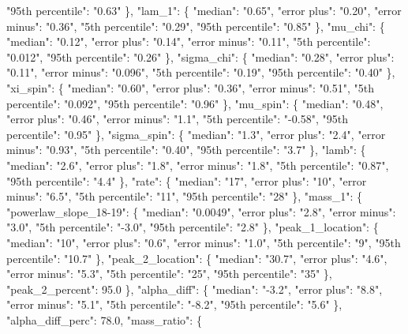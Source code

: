 {{        "95th percentile": "0.63"%
      \}, %
      "lam\_1": \{%
        "median": "0.65", %
        "error plus": "0.20", %
        "error minus": "0.36", %
        "5th percentile": "0.29", %
        "95th percentile": "0.85"%
      \}, %
      "mu\_chi": \{%
        "median": "0.12", %
        "error plus": "0.14", %
        "error minus": "0.11", %
        "5th percentile": "0.012", %
        "95th percentile": "0.26"%
      \}, %
      "sigma\_chi": \{%
        "median": "0.28", %
        "error plus": "0.11", %
        "error minus": "0.096", %
        "5th percentile": "0.19", %
        "95th percentile": "0.40"%
      \}, %
      "xi\_spin": \{%
        "median": "0.60", %
        "error plus": "0.36", %
        "error minus": "0.51", %
        "5th percentile": "0.092", %
        "95th percentile": "0.96"%
      \}, %
      "mu\_spin": \{%
        "median": "0.48", %
        "error plus": "0.46", %
        "error minus": "1.1", %
        "5th percentile": "{-}0.58", %
        "95th percentile": "0.95"%
      \}, %
      "sigma\_spin": \{%
        "median": "1.3", %
        "error plus": "2.4", %
        "error minus": "0.93", %
        "5th percentile": "0.40", %
        "95th percentile": "3.7"%
      \}, %
      "lamb": \{%
        "median": "2.6", %
        "error plus": "1.8", %
        "error minus": "1.8", %
        "5th percentile": "0.87", %
        "95th percentile": "4.4"%
      \}, %
      "rate": \{%
        "median": "17", %
        "error plus": "10", %
        "error minus": "6.5", %
        "5th percentile": "11", %
        "95th percentile": "28"%
      \}, %
      "mass\_1": \{%
        "powerlaw\_slope\_18{-}19": \{%
          "median": "0.0049", %
          "error plus": "2.8", %
          "error minus": "3.0", %
          "5th percentile": "{-}3.0", %
          "95th percentile": "2.8"%
        \}, %
        "peak\_1\_location": \{%
          "median": "10", %
          "error plus": "0.6", %
          "error minus": "1.0", %
          "5th percentile": "9", %
          "95th percentile": "10.7"%
        \}, %
        "peak\_2\_location": \{%
          "median": "30.7", %
          "error plus": "4.6", %
          "error minus": "5.3", %
          "5th percentile": "25", %
          "95th percentile": "35"%
        \}, %
        "peak\_2\_percent": 95.0%
      \}, %
      "alpha\_diff": \{%
        "median": "{-}3.2", %
        "error plus": "8.8", %
        "error minus": "5.1", %
        "5th percentile": "{-}8.2", %
        "95th percentile": "5.6"%
      \}, %
      "alpha\_diff\_perc": 78.0, %
      "mass\_ratio": \{%
}}
